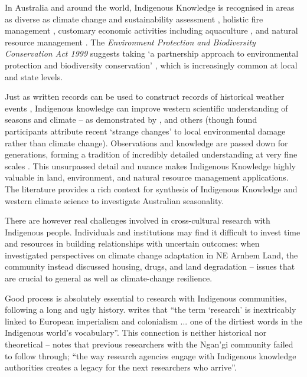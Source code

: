 In Australia and around the world, Indigenous Knowledge is recognised
in areas as diverse as climate change and sustainability assessment
\citep[eg.][]{cochran2015}, holistic fire management \citep[eg.][]{clarke2009,price2012},
customary economic activities including aquaculture \citep{woodward2012a}, and
natural resource management \citep[eg.][]{prober2011}.  The \textit{Environment
Protection and Biodiversity Conservation Act 1999} suggests taking `a
partnership approach to environmental protection and biodiversity conservation'
\citep{ens2012}, which is increasingly common at local and state levels.


Just as written records can be used to construct records of historical weather
events \citep[eg.][]{rodrigo1999}, Indigenous knowledge can improve western
scientific understanding of seasons and climate -- as demonstrated by
\citet{green2010a,clarke2009}, and others (though \citet{green2010a} found
participants attribute recent `strange changes' to local environmental damage
rather than climate change).
%
Observations and knowledge are passed down for generations, forming a
tradition of incredibly detailed understanding at very fine scales \citep{barber2005}.
This unsurpassed detail and nuance makes Indigenous Knowledge highly valuable
in land, environment, and natural resource management applications.
The literature provides a rich context for synthesis of Indigenous Knowledge
and western climate science to investigate Australian seasonality.


There are however real challenges involved in cross-cultural research with
Indigenous people.  Individuals and institutions may find it difficult to
invest time and resources in building relationships with uncertain outcomes:
when \citet{petheram2010}
investigated perspectives on climate change adaptation in NE Arnhem Land,
the community instead discussed housing, drugs, and land degradation -- issues
that are crucial to general as well as climate-change resilience.

Good process is absolutely essential to research with Indigenous communities,
following a long and ugly history.  \citet{smith1999} writes that ``the term
`research' is inextricably linked to European imperialism and colonialism ...
one of the dirtiest words in the Indigenous world's vocabulary''. This
connection is neither historical nor theoretical -- \citet{woodward2010} notes
that previous researchers with the Ngan'gi community failed to follow through;
``the way research agencies engage with Indigenous knowledge authorities
creates a legacy for the next researchers who arrive''.


